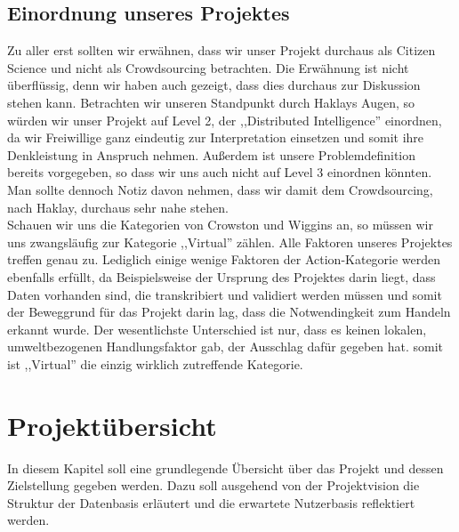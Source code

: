 \documentclass{article}
\begin{document}
\subsection{Einordnung unseres Projektes}
Zu aller erst sollten wir erwähnen, dass wir unser Projekt durchaus als Citizen Science und nicht als Crowdsourcing betrachten. Die Erwähnung ist nicht überflüssig, denn wir haben auch gezeigt, dass dies durchaus zur Diskussion stehen kann. Betrachten wir unseren Standpunkt durch Haklays Augen, so würden wir unser Projekt auf Level 2, der ,,Distributed Intelligence'' einordnen, da wir Freiwillige ganz eindeutig zur Interpretation einsetzen und somit ihre Denkleistung in Anspruch nehmen. Außerdem ist unsere Problemdefinition bereits vorgegeben, so dass wir uns auch nicht auf Level 3 einordnen könnten. Man sollte dennoch Notiz davon nehmen, dass wir damit dem Crowdsourcing, nach Haklay, durchaus sehr nahe stehen.\\
Schauen wir uns die Kategorien von Crowston und Wiggins an, so müssen wir uns zwangsläufig zur Kategorie ,,Virtual'' zählen. Alle Faktoren unseres Projektes treffen genau zu. Lediglich einige wenige Faktoren der Action-Kategorie werden ebenfalls erfüllt, da Beispielsweise der Ursprung des Projektes darin liegt, dass Daten vorhanden sind, die transkribiert und validiert werden müssen und somit der Beweggrund für das Projekt darin lag, dass die Notwendingkeit zum Handeln erkannt wurde. Der wesentlichste Unterschied ist nur, dass es keinen lokalen, umweltbezogenen Handlungsfaktor gab, der Ausschlag dafür gegeben hat. somit ist ,,Virtual'' die einzig wirklich zutreffende Kategorie.

\section{Projektübersicht}
In diesem Kapitel soll eine grundlegende Übersicht über das Projekt und dessen Zielstellung gegeben werden. Dazu soll ausgehend von der Projektvision die Struktur der Datenbasis erläutert und die erwartete Nutzerbasis reflektiert werden.
\end{document}
